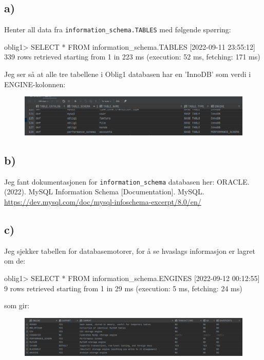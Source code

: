 \documentclass[%
notitlepage,
 amsmath,amssymb,
 aps,
rmp,
]{revtex4-2}  %
\begin{document}
\subsection*{a)}
Henter all data fra \verb+information_schema.TABLES+ med følgende spørring:
\begin{sql}
oblig1> SELECT *
        FROM information_schema.TABLES
[2022-09-11 23:55:12] 339 rows retrieved starting from 1 in 223 ms (execution: 52 ms, fetching: 171 ms)
\end{sql}
Jeg ser så at alle tre tabellene i Oblig1 databasen har en 'InnoDB' som verdi i ENGINE-kolonnen:
\begin{figure}[H]
\centering\includegraphics[width=\columnwidth]{op4a.png}
\end{figure}

\subsection*{b)}
Jeg fant dokumentasjonen for \verb+information_schema+ databasen her:
ORACLE. (2022). MySQL Information Schema [Documentation]. MySQL. \sloppy\url{https://dev.mysql.com/doc/mysql-infoschema-excerpt/8.0/en/}

\subsection*{c)}
Jeg sjekker tabellen for databasemotorer, for å se hvaslags informasjon er lagret om de:
\begin{sql}
oblig1> SELECT *
        FROM information_schema.ENGINES
[2022-09-12 00:12:55] 9 rows retrieved starting from 1 in 29 ms (execution: 5 ms, fetching: 24 ms)
\end{sql}
som gir:
\begin{figure}[H]
\centering\includegraphics[width=\columnwidth]{op4c1.png}
\end{figure}
\end{document}

